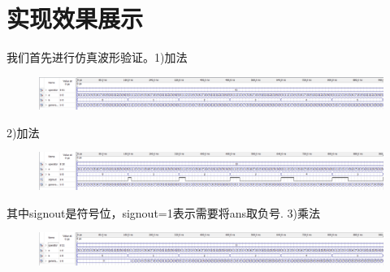 \documentclass[UTF8]{ctexart}
\begin{document}
\section{实现效果展示}
我们首先进行仿真波形验证。1)加法
\begin{figure}[H]\centering
    {
        \includegraphics[scale=0.5]{add.PNG}
        \restoregeometry
    }
\end{figure}
    2)加法
    \begin{figure}[H]\centering
        {
            \includegraphics[scale=0.5]{sub.PNG}
            \restoregeometry
        }
    \end{figure}
其中signout是符号位，signout=1表示需要将ans取负号.
3)乘法
\begin{figure}[H]\centering
    {
        \includegraphics[scale=0.5]{mul.PNG}
        \restoregeometry
    }
\end{figure}
\end{document}
